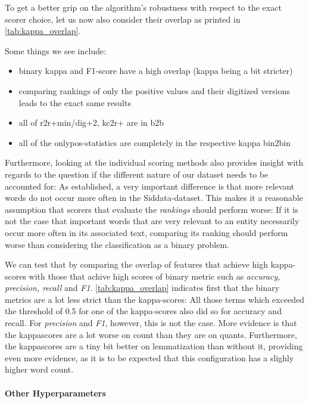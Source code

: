 To get a better grip on the algorithm's robustness with respect to the exact scorer choice, let us now also consider their overlap as printed in \autoref{tab:kappa_overlap}. %

Some things we see include:
\begin{itemize}
    \item binary kappa and F1-score have a high overlap (kappa being a bit stricter)
    \item comparing rankings of only the positive values and their digitized versions leads to the exact same results
    \item all of r2r+min/dig+2, kc2r+ are in b2b
    \item all of the onlypos-statistics are completely in the respective kappa bin2bin
\end{itemize}

Furthermore, looking at the individual scoring methods also provides insight with regards to the question if the different nature of our dataset needs to be accounted for: As established, a very important difference is that more relevant words do not occur more often in the Siddata-dataset. This makes it a reasonable assumption that scorers that evaluate the \textit{rankings} should perform worse: If it is not the case that important words that are very relevant to an entity necessarily occur more often in its associated text, comparing its ranking should perform worse than considering the classification as a binary problem. 

We can test that by comparing the overlap of features that achieve high kappa-scores with those that achive high scores of binary metric such as \textit{accuracy, precision, recall} and \textit{F1}. \autoref{tab:kappa_overlap} indicates first that the binary metrics are a lot less strict than the kappa-scores: All those terms which exceeded the threshold of 0.5 for one of the kappa-scores also did so for accuracy and recall. For \textit{precision} and \textit{F1}, however, this is not the case. More evidence is that the kappascores are a lot worse on count than they are on \glspl{quant}. Furthermore, the kappascores are a tiny bit better on lemmatization than without it, providing even more evidence, as it is to be expected that this configuration has a slighly higher word count.
 
\paragraph{Other Hyperparameters}

